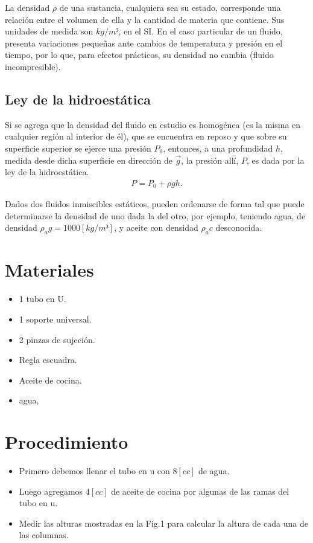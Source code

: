 \documentclass[a4paper, 12p]{article}
\begin{document}
La densidad $\rho$ de una sustancia, cualquiera sea su estado, corresponde una relación entre el volumen de ella y la cantidad de materia que contiene. Sus unidades de medida son $kg/m³$, en el SI. En el caso particular de un fluido, 
presenta variaciones pequeñas ante cambios de temperatura y presión en el tiempo, por lo que, para efectos prácticos, su densidad no cambia (fluido incompresible).

\subsection*{Ley de la hidroestática}
Si se agrega que la densidad del fluido en estudio es homogénea (es la misma en cualquier región al interior de él), que se encuentra en reposo y que sobre su superficie superior se ejerce una presión $P_0$, entonces, a una profundidad $h$, 
medida desde dicha superficie en dirección de $\vec{g}$, la presión allí, $P$, es dada por la ley de la hidroestática.
\begin{align}
      P=P_0 +  \rho gh.
\end{align}

Dados dos fluidos inmiscibles estáticos, pueden ordenarse de forma tal que puede determinarse la densidad de uno dada la del otro, por ejemplo, teniendo agua, de densidad $\rho_ag = 1000[kg/m³]$, y aceite con densidad $\rho_ac$ desconocida.



\section{Materiales}


\begin{itemize}
      \item 1 tubo en U.
      \item 1 soporte universal.
      \item 2 pinzas de sujeción.
      \item Regla escuadra.
      \item Aceite de cocina.
      \item agua,
\end{itemize}

\section{Procedimiento}

\begin{itemize}
      \item Primero debemos llenar el tubo en u con $8[cc]$ de agua.
      
      \item Luego agregamos $4[cc]$ de aceite de cocina por algunas de las ramas del tubo en u.
      
      \item Medir las alturas mostradas en la Fig.1 para calcular la altura de cada una de las columnas.
      
\end{itemize}
\end{document}
